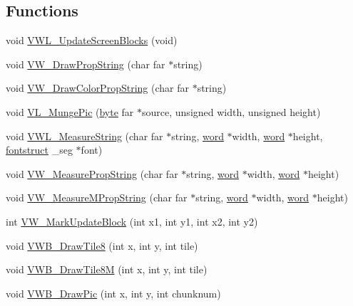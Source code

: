 \subsection*{Functions}
\begin{DoxyCompactItemize}
\item 
void \hyperlink{ID__VH_8C_a2f63a9faaad13963407fd1542cde062e}{VWL\_\-UpdateScreenBlocks} (void)
\item 
void \hyperlink{ID__VH_8C_aa04e30bf96c1946e8ea67a175f3580f2}{VW\_\-DrawPropString} (char far $\ast$string)
\item 
void \hyperlink{ID__VH_8C_a2181750f20d152c6c5ef7d6115a75a7f}{VW\_\-DrawColorPropString} (char far $\ast$string)
\item 
void \hyperlink{ID__VH_8C_a3d96886ea2eea0773d12d9c494ecd8dc}{VL\_\-MungePic} (\hyperlink{ID__HEAD_8H_a0c8186d9b9b7880309c27230bbb5e69d}{byte} far $\ast$source, unsigned width, unsigned height)
\item 
void \hyperlink{ID__VH_8C_a1dcff14408a2d43f72ea12a512413f0c}{VWL\_\-MeasureString} (char far $\ast$string, \hyperlink{ID__HEAD_8H_abad51e07ab6d26bec9f1f786c8d65bcd}{word} $\ast$width, \hyperlink{ID__HEAD_8H_abad51e07ab6d26bec9f1f786c8d65bcd}{word} $\ast$height, \hyperlink{structfontstruct}{fontstruct} \_\-seg $\ast$font)
\item 
void \hyperlink{ID__VH_8C_a6f83e267adde8f5625ff9d63bde9d19f}{VW\_\-MeasurePropString} (char far $\ast$string, \hyperlink{ID__HEAD_8H_abad51e07ab6d26bec9f1f786c8d65bcd}{word} $\ast$width, \hyperlink{ID__HEAD_8H_abad51e07ab6d26bec9f1f786c8d65bcd}{word} $\ast$height)
\item 
void \hyperlink{ID__VH_8C_aa5d86137b8daf0637922769e831f00aa}{VW\_\-MeasureMPropString} (char far $\ast$string, \hyperlink{ID__HEAD_8H_abad51e07ab6d26bec9f1f786c8d65bcd}{word} $\ast$width, \hyperlink{ID__HEAD_8H_abad51e07ab6d26bec9f1f786c8d65bcd}{word} $\ast$height)
\item 
int \hyperlink{ID__VH_8C_a989fc2652f729213162c520d378578b3}{VW\_\-MarkUpdateBlock} (int x1, int y1, int x2, int y2)
\item 
void \hyperlink{ID__VH_8C_a7503d2d58d938b13174536e76796c4c2}{VWB\_\-DrawTile8} (int x, int y, int tile)
\item 
void \hyperlink{ID__VH_8C_a1ecd055d301eb59747c8a19756939dfc}{VWB\_\-DrawTile8M} (int x, int y, int tile)
\item 
void \hyperlink{ID__VH_8C_a997467dad7e57de584aa100eb9a8c882}{VWB\_\-DrawPic} (int x, int y, int chunknum)
\item 

\end{DoxyCompactItemize}
